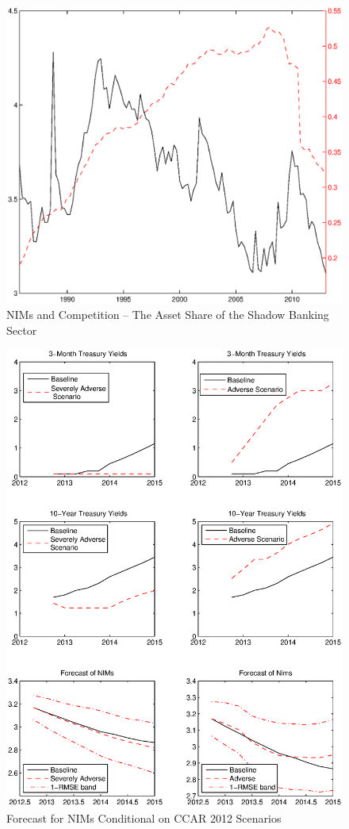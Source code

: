 \documentclass[11pt]{article}
\begin{document}
\clearpage
\begin{figure}
\flushleft
\caption{NIMs and Competition -- The Asset Share of the Shadow Banking Sector} \label{figure_nims_competition}

\hspace{-2.5cm} \includegraphics[scale=0.85]{figure_nims_competition.ps}
\end{figure}

\clearpage
\begin{figure}
\flushleft
\caption{Forecast for NIMs Conditional on CCAR 2012 Scenarios} \label{figure_scenario}

 \includegraphics[scale=0.85]{figure_scenario.ps}
\end{figure}
\end{document}
